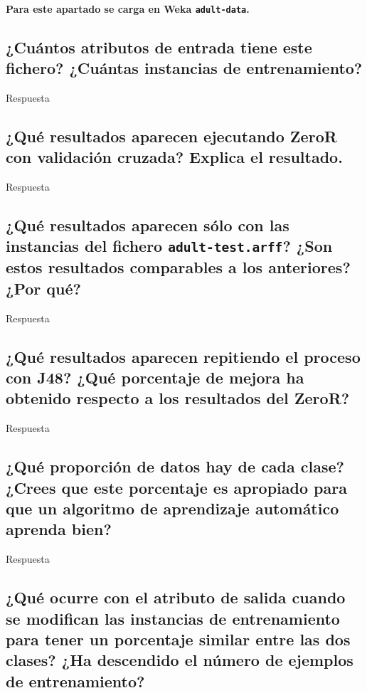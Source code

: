\documentclass[12pt]{article}
\begin{document}
\paragraph{\small Para este apartado se carga en Weka \texttt{adult-data}.}

\subsection*{\small ¿Cuántos atributos de entrada tiene este fichero? ¿Cuántas
instancias de entrenamiento?}

Respuesta

\subsection*{\small ¿Qué resultados aparecen ejecutando ZeroR con validación
cruzada? Explica el resultado.}

Respuesta

\subsection*{\small ¿Qué resultados aparecen sólo con las instancias del fichero
\texttt{adult-test.arff}? ¿Son estos resultados comparables a los anteriores?
¿Por qué?}

Respuesta

\subsection*{\small ¿Qué resultados aparecen repitiendo el proceso con J48?
¿Qué porcentaje de mejora ha obtenido respecto a los resultados del ZeroR?}

Respuesta

\subsection*{\small ¿Qué proporción de datos hay de cada clase? ¿Crees que este
porcentaje es apropiado para que un algoritmo de aprendizaje automático aprenda
bien?}

Respuesta

\subsection*{\small ¿Qué ocurre con el atributo de salida cuando se modifican
las instancias de entrenamiento para tener un porcentaje similar entre las dos
clases? ¿Ha descendido el número de ejemplos de entrenamiento?}
\end{document}
